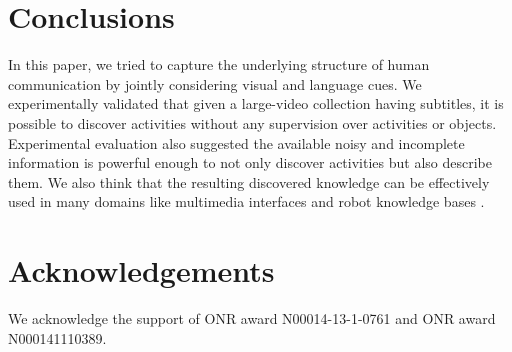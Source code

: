 

\section{Conclusions}
\vspace{-2mm}
In this paper, we tried to capture the underlying structure of human communication by jointly considering visual and language cues. We experimentally validated that given a large-video collection having subtitles, it is possible to discover activities without any supervision over activities or objects. Experimental evaluation also suggested the available noisy and incomplete information is powerful enough to not only discover activities but also describe them. We also think that the resulting discovered knowledge can be effectively used in many domains like multimedia interfaces and robot knowledge bases \cite{robobrain}. 
\vspace{-2mm}
\section{Acknowledgements}
\vspace{-2mm}
We acknowledge the support of ONR award N00014-13-1-0761 and ONR award N000141110389.
\vspace{-2mm}

